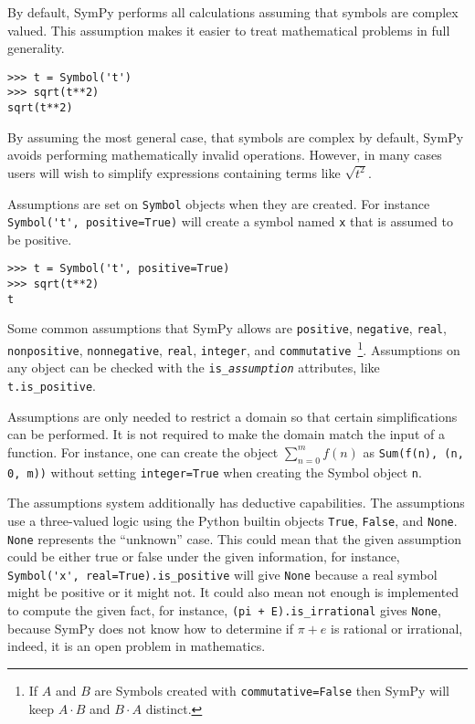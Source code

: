 By default, SymPy performs all calculations assuming that symbols are
complex valued. This assumption makes it easier to treat mathematical problems
in full generality.
\begin{verbatim}
>>> t = Symbol('t')
>>> sqrt(t**2)
sqrt(t**2)
\end{verbatim}

By assuming the most general case, that symbols are complex by default, SymPy
avoids performing mathematically invalid operations. However, in many cases
users will wish to simplify expressions containing terms like $\sqrt{t^2}$.

Assumptions are set on \texttt{Symbol} objects when they are created. For
instance \verb|Symbol('t', positive=True)| will create a symbol named
\texttt{x} that is assumed to be positive.
\begin{verbatim}
>>> t = Symbol('t', positive=True)
>>> sqrt(t**2)
t
\end{verbatim}
Some common assumptions that SymPy allows are \texttt{positive},
\texttt{negative}, \texttt{real}, \texttt{nonpositive}, \texttt{nonnegative},
\texttt{real}, \texttt{integer}, and \texttt{commutative}~\footnote{If $A$ and
$B$ are Symbols created with \texttt{commutative=False} then SymPy will keep
$A\cdot B$ and $B\cdot A$ distinct.}. Assumptions on any object can be checked with the
\verb|is_|\texttt{\textit{assumption}} attributes, like \verb|t.is_positive|.

Assumptions are only needed to restrict a domain so that certain
simplifications can be performed. It is not required to make the domain match
the input of a function. For instance, one can create the object
$\sum_{n=0}^m f(n)$ as \verb|Sum(f(n), (n, 0, m))| without setting
\texttt{integer=True} when creating the Symbol object \texttt{n}.

The assumptions system additionally has deductive capabilities. The
assumptions use a three-valued logic using the Python builtin objects
\texttt{True}, \texttt{False}, and \texttt{None}. \texttt{None} represents the
``unknown'' case. This could mean that the given assumption could be either
true or false under the given information, for instance,
\verb|Symbol('x', real=True).is_positive| will give \texttt{None} because a real
symbol might be positive or it might not. It could also mean not enough is
implemented to compute the given fact, for instance,
\verb|(pi + E).is_irrational| gives \texttt{None}, because SymPy does not know
how to determine if $\pi + e$ is rational or irrational, indeed, it is an open
problem in mathematics.


